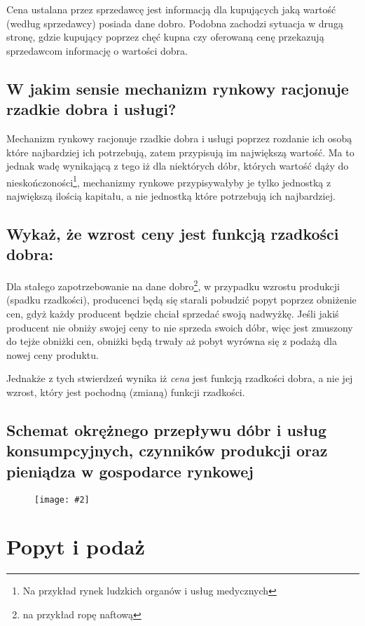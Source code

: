 \documentclass[a4paper,12pt]{article}
\newcommand{\obrazek}[2]{
	\begin{figure}[h]
		\centering
		\texttt{[image: \#2]}
	\end{figure}
}
\begin{document}
\vspace{.3cm}

Cena ustalana przez sprzedawcę jest informacją dla kupujących jaką wartość (według sprzedawcy) posiada dane dobro. Podobna zachodzi sytuacja w drugą stronę, gdzie kupujący poprzez chęć kupna czy oferowaną cenę przekazują sprzedawcom informację o wartości dobra.

\subsection{W jakim sensie mechanizm rynkowy racjonuje rzadkie dobra i usługi?}

Mechanizm rynkowy racjonuje rzadkie dobra i usługi poprzez rozdanie ich osobą które najbardziej ich potrzebują, zatem przypisują im największą wartość. Ma to jednak wadę wynikającą z tego iż dla niektórych dóbr, których wartość dąży do nieskończoności\footnote{Na przykład rynek ludzkich organów i usług medycznych}, mechanizmy rynkowe przypisywałyby je tylko jednostką z największą ilością kapitału, a nie jednostką które potrzebują ich najbardziej.

\subsection{Wykaż, że wzrost ceny jest funkcją rzadkości dobra:}

Dla stałego zapotrzebowanie na dane dobro\footnote{na przykład ropę naftową}, w przypadku wzrostu produkcji (spadku rzadkości), producenci będą się starali pobudzić popyt poprzez obniżenie cen, gdyż każdy producent będzie chciał sprzedać swoją nadwyżkę. Jeśli jakiś producent nie obniży swojej ceny to nie sprzeda swoich dóbr, więc jest zmuszony do tejże obniżki cen, obniżki będą trwały aż pobyt wyrówna się z podażą dla nowej ceny produktu.

Jednakże z tych stwierdzeń wynika iż \emph{cena} jest funkcją rzadkości dobra, a nie jej wzrost, który jest pochodną (zmianą) funkcji rzadkości.

\subsection{Schemat okrężnego przepływu dóbr i usług konsumpcyjnych, czynników produkcji oraz pieniądza w gospodarce rynkowej}

\obrazek{0.5}{schemat1.png}

\section{Popyt i podaż}
\end{document}
